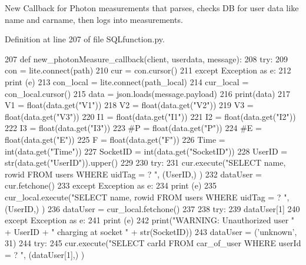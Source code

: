 New Callback for Photon measurements that parses, checks DB for user data like name and carname, then logs into \textquotesingle{}measurements\textquotesingle{}. 



Definition at line 207 of file S\+Q\+Lfunction.\+py.


\begin{DoxyCode}
207 \textcolor{keyword}{def }new_photonMeasure_callback(client, userdata, message):
208     \textcolor{keywordflow}{try}:
209         con = lite.connect(path)
210         cur = con.cursor()
211     \textcolor{keywordflow}{except} Exception \textcolor{keyword}{as} e:
212         \textcolor{keywordflow}{print} (e)
213     con\_local = lite.connect(path\_local)
214     cur\_local = con\_local.cursor()
215     data = json.loads(message.payload)    
216     print(data)
217     V1 = float(data.get(\textcolor{stringliteral}{"V1"}))
218     V2 = float(data.get(\textcolor{stringliteral}{"V2"}))
219     V3 = float(data.get(\textcolor{stringliteral}{"V3"}))
220     I1 = float(data.get(\textcolor{stringliteral}{"I1"}))
221     I2 = float(data.get(\textcolor{stringliteral}{"I2"}))
222     I3 = float(data.get(\textcolor{stringliteral}{"I3"}))
223     \textcolor{comment}{#P = float(data.get("P"))}
224     \textcolor{comment}{#E = float(data.get("E"))}
225     F = float(data.get(\textcolor{stringliteral}{"F"}))
226     Time = int(data.get(\textcolor{stringliteral}{"Time"}))
227     SocketID = int(data.get(\textcolor{stringliteral}{"SocketID"}))
228     UserID = str(data.get(\textcolor{stringliteral}{"UserID"})).upper()
229     
230     \textcolor{keywordflow}{try}:
231         cur.execute(\textcolor{stringliteral}{"SELECT name, rowid FROM users WHERE uidTag = ? "}, (UserID,) )
232         dataUser = cur.fetchone()
233     \textcolor{keywordflow}{except} Exception \textcolor{keyword}{as} e:
234         \textcolor{keywordflow}{print} (e)
235         cur\_local.execute(\textcolor{stringliteral}{"SELECT name, rowid FROM users WHERE uidTag = ? "}, (UserID,) )
236         dataUser = cur\_local.fetchone()
237         
238     \textcolor{keywordflow}{try}:
239         dataUser[1]
240     \textcolor{keywordflow}{except} Exception \textcolor{keyword}{as} e:
241         \textcolor{keywordflow}{print} (e)
242         print(\textcolor{stringliteral}{"WARNING: Unauthorized user "} + UserID + \textcolor{stringliteral}{" charging at socket "} + str(SocketID))
243         dataUser = (\textcolor{stringliteral}{'unknown'}, 31)                
244     \textcolor{keywordflow}{try}:
245         cur.execute(\textcolor{stringliteral}{"SELECT carId FROM car\_of\_user WHERE userId = ? "}, (dataUser[1],) )

\end{DoxyCode}
